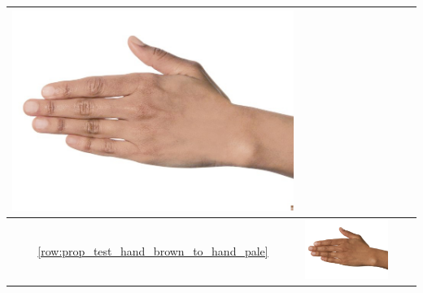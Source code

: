 \documentclass[12pt, a4paper]{article}
\begin{document}
\begin{longtable}{|c||c|c|c|}
\begin{minipage}{.29\textwidth}
    \includegraphics[width=\textwidth,height=\textheight,keepaspectratio]{../rc_test/outputs/20170516_proportional_test/hand_brown_to_hand_light.jpg}
  \end{minipage} \\
  \hline  \ref{row:prop_test_hand_brown_to_hand_pale} &
  \begin{minipage}{.29\textwidth}
    \includegraphics[width=\textwidth,height=\textheight,keepaspectratio]{../inputs/hand_brown.jpg}
  \end{minipage} & 
  \begin{minipage}{.29\textwidth}

\end{minipage}
\end{longtable}
\end{document}
